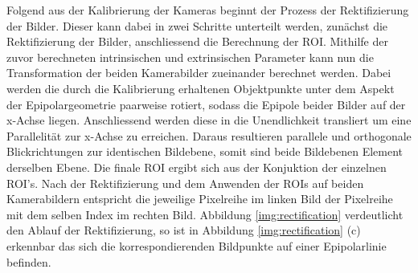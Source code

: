 \noindent
Folgend aus der Kalibrierung der Kameras beginnt der Prozess der Rektifizierung der Bilder. Dieser kann dabei in zwei Schritte unterteilt werden, zunächst die Rektifizierung der Bilder, anschliessend die Berechnung der ROI. Mithilfe der zuvor berechneten intrinsischen und extrinsischen Parameter kann nun die Transformation der beiden Kamerabilder zueinander berechnet werden. Dabei werden die durch die Kalibrierung erhaltenen Objektpunkte unter dem Aspekt der Epipolargeometrie paarweise rotiert, sodass die Epipole beider Bilder auf der x-Achse liegen. Anschliessend werden diese in die Unendlichkeit transliert um eine Parallelität zur x-Achse zu erreichen. Daraus resultieren parallele und orthogonale Blickrichtungen zur identischen Bildebene, somit sind beide Bildebenen Element derselben Ebene.
Die finale ROI ergibt sich aus der Konjuktion der einzelnen ROI's. Nach der Rektifizierung und dem Anwenden der ROIs auf beiden Kamerabildern entspricht die jeweilige Pixelreihe im linken Bild der Pixelreihe mit dem selben Index im rechten Bild. Abbildung \ref{img:rectification} verdeutlicht den Ablauf der Rektifizierung, so ist in Abbildung \ref{img:rectification} (c) erkennbar das sich die korrespondierenden Bildpunkte auf einer Epipolarlinie befinden.\\

